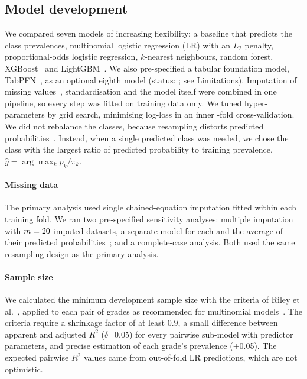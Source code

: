 \subsection{Model development}
We compared seven models of increasing flexibility: a baseline that predicts the class prevalences,
multinomial logistic regression (LR) with an $L_2$ penalty, proportional-odds logistic regression,
$k$-nearest neighbours, random forest, XGBoost~\citep{chen2016xgboost} and
LightGBM~\citep{ke2017lightgbm}. We also pre-specified a tabular foundation model,
TabPFN~\citep{hollmann2025tabpfn}, as an optional eighth model (status: \TabpfnStatus; see
Limitations). Imputation of missing values~\citep{vanbuuren2011mice}, standardisation and the model
itself were combined in one pipeline, so every step was fitted on training data only. We tuned
hyper-parameters by grid search, minimising log-loss in an inner \InnerFolds-fold cross-validation.
We did not rebalance the classes, because resampling distorts predicted
probabilities~\citep{vandengoorbergh2022imbalance}. Instead, when a single predicted class was
needed, we chose the class with the largest ratio of predicted probability to training prevalence,
$\hat y=\arg\max_k p_k/\pi_k$.

\paragraph{Missing data} The primary analysis used single chained-equation imputation fitted within
each training fold. We ran two pre-specified sensitivity analyses: multiple imputation with
$m=20$ imputed datasets, a separate model for each and the average of their predicted
probabilities~\citep{sisk2023imputation,hoogland2020missing}; and a complete-case analysis. Both
used the same resampling design as the primary analysis.

\paragraph{Sample size} We calculated the minimum development sample size with the criteria of Riley
et al.~\citep{riley2020samplesize}, applied to each pair of grades as recommended for multinomial
models~\citep{pate2023multinomial}. The criteria require a shrinkage factor of at least 0.9, a small
difference between apparent and adjusted $R^2$ ($\delta$=0.05) for every pairwise sub-model with
\SSParams{} predictor parameters, and precise estimation of each grade's prevalence ($\pm$0.05). The
expected pairwise $R^2$ values came from out-of-fold LR predictions, which are not optimistic.

